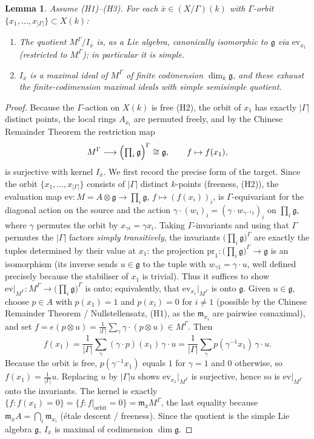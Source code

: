 \documentclass{amsart}
\newtheorem{lemma}{Lemma}
\theoremstyle{definition}
\newcommand{\g}{\mathfrak{g}}
\newcommand{\M}{M}
\begin{document}
\begin{lemma}\label{lem:fibres}
Assume \textnormal{(H1)--(H3)}.  For each $\bar x\in (X/\Gamma)(k)$ with
$\Gamma$-orbit $\{x_1,\dots,x_{|\Gamma|}\}\subset X(k)$:
\begin{enumerate}
\item The quotient $\M^\Gamma/I_{\bar x}$ is, as a Lie algebra,
canonically isomorphic to $\g$ via $\mathrm{ev}_{x_1}$ (restricted to
$\M^\Gamma$); in particular it is simple.
\item $I_{\bar x}$ is a maximal ideal of $\M^\Gamma$ of finite
codimension $\dim_k\g$, and these exhaust the finite-codimension maximal
ideals with simple semisimple quotient.
\end{enumerate}
\end{lemma}
\begin{proof}
Because the $\Gamma$-action on $X(k)$ is free (H2), the orbit of $x_1$ has
exactly $|\Gamma|$ distinct points, the local rings $A_{x_i}$ are permuted
freely, and by the Chinese Remainder Theorem the restriction map
\[
\M^\Gamma\longrightarrow\Bigl(\textstyle\prod_{i}\g\Bigr)^\Gamma\cong\g,
\qquad f\mapsto f(x_1),
\]
is surjective with kernel $I_{\bar x}$.  We first record the precise form
of the target.  Since the orbit $\{x_1,\dots,x_{|\Gamma|}\}$ consists of
$|\Gamma|$ distinct $k$-points (freeness, (H2)), the evaluation map
$\mathrm{ev}\colon\M=A\otimes\g\to\prod_{i}\g$, $f\mapsto(f(x_i))_i$, is
$\Gamma$-equivariant for the diagonal action on the source and the action
$\gamma\cdot(w_i)_i=(\gamma\cdot w_{\gamma^{-1}i})_i$ on
$\prod_i\g$, where $\gamma$ permutes the orbit by
$x_{\gamma i}=\gamma x_i$.  Taking $\Gamma$-invariants and using that
$\Gamma$ permutes the $|\Gamma|$ factors \emph{simply transitively}, the
invariants $\bigl(\prod_i\g\bigr)^\Gamma$ are exactly the tuples
determined by their value at $x_1$: the projection
$\mathrm{pr}_{1}\colon\bigl(\prod_i\g\bigr)^\Gamma\to\g$ is an
isomorphism (its inverse sends $u\in\g$ to the tuple with
$w_{\gamma 1}=\gamma\cdot u$, well defined precisely because the
stabiliser of $x_1$ is trivial).  Thus it suffices to show
$\mathrm{ev}|_{\M^\Gamma}\colon\M^\Gamma\to\bigl(\prod_i\g\bigr)^\Gamma$
is onto; equivalently, that $\mathrm{ev}_{x_1}|_{\M^\Gamma}$ is onto $\g$.
Given $u\in\g$, choose $p\in A$ with $p(x_1)=1$ and $p(x_i)=0$ for
$i\ne1$ (possible by the Chinese Remainder Theorem / Nullstellensatz,
(H1), as the $\mathfrak m_{x_i}$ are pairwise comaximal), and set
$f=e(p\otimes u)=\frac1{|\Gamma|}\sum_{\gamma}\gamma\cdot(p\otimes u)
\in\M^\Gamma$.  Then
\[
f(x_1)=\frac1{|\Gamma|}\sum_\gamma (\gamma\cdot p)(x_1)\,\gamma\cdot u
=\frac1{|\Gamma|}\sum_\gamma p(\gamma^{-1}x_1)\,\gamma\cdot u .
\]
Because the orbit is free, $p(\gamma^{-1}x_1)$ equals
$1$ for $\gamma=1$ and $0$ otherwise, so $f(x_1)=\frac1{|\Gamma|}u$.
Replacing $u$ by $|\Gamma|u$ shows $\mathrm{ev}_{x_1}|_{\M^\Gamma}$ is
surjective, hence so is $\mathrm{ev}|_{\M^\Gamma}$ onto the invariants.  The kernel is exactly
$\{f:f(x_1)=0\}=\{f:f|_{\text{orbit}}=0\}=\mathfrak m_{\bar x}\M^\Gamma$,
the last equality because $\mathfrak m_{\bar x}A=\bigcap_i\mathfrak m_{x_i}$
(\'etale descent / freeness).  Since the quotient is the simple Lie
algebra $\g$, $I_{\bar x}$ is maximal of codimension $\dim\g$.


\end{proof}
\end{document}
